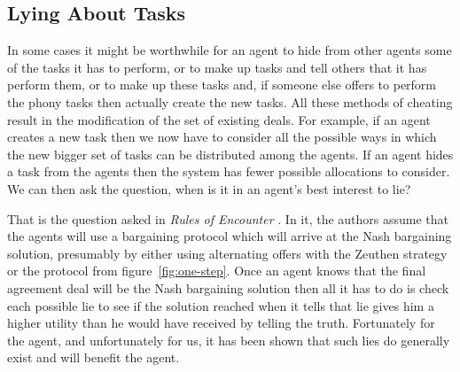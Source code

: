 \subsection{Lying About Tasks}

In some cases it might be worthwhile for an agent to hide from other
agents some of the tasks it has to perform, or to make up tasks and
tell others that it has perform them, or to make up these tasks and,
if someone else offers to perform the phony tasks then actually create
the new tasks. All these methods of cheating result in the
modification of the set of existing deals. For example, if an agent
creates a new task then we now have to consider all the possible ways
in which the new bigger set of tasks can be distributed among the
agents. If an agent hides a task from the agents then the system has
fewer possible allocations to consider. We can then ask the question,
when is it in an agent's best interest to lie?

That is the question asked in \emph{Rules of Encounter}
\cite{rosenschein94a}. In it, the authors assume that the agents will
use a bargaining protocol which will arrive at the Nash bargaining
solution, presumably by either using alternating offers with the
Zeuthen strategy or the  protocol from
figure~\ref{fig:one-step}.  Once an agent knows that the final
agreement deal will be the Nash bargaining solution then all it has to
do is check each possible lie to see if the solution reached when it
tells that lie gives him a higher utility than he would have received
by telling the truth. Fortunately for the agent, and unfortunately for
us, it has been shown that such lies do generally exist and will
benefit the agent.

